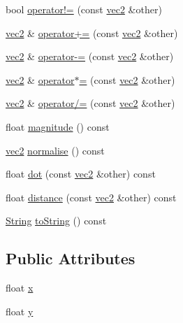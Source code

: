 \begin{DoxyCompactItemize}
\item 
bool \hyperlink{structspork_1_1maths_1_1vec2_aeb16440e205e6a8012bc92d48b904600}{operator!=} (const \hyperlink{structspork_1_1maths_1_1vec2}{vec2} \&other)
\item 
\hyperlink{structspork_1_1maths_1_1vec2}{vec2} \& \hyperlink{structspork_1_1maths_1_1vec2_a5a4c857c0a9d6ae8566b3b923f588800}{operator+=} (const \hyperlink{structspork_1_1maths_1_1vec2}{vec2} \&other)
\item 
\hyperlink{structspork_1_1maths_1_1vec2}{vec2} \& \hyperlink{structspork_1_1maths_1_1vec2_a717c7f2437ffa1142baaf2c1c4deae89}{operator-\/=} (const \hyperlink{structspork_1_1maths_1_1vec2}{vec2} \&other)
\item 
\hyperlink{structspork_1_1maths_1_1vec2}{vec2} \& \hyperlink{structspork_1_1maths_1_1vec2_af5a50810095db0445b4ad5fb9b06b90b}{operator$\ast$=} (const \hyperlink{structspork_1_1maths_1_1vec2}{vec2} \&other)
\item 
\hyperlink{structspork_1_1maths_1_1vec2}{vec2} \& \hyperlink{structspork_1_1maths_1_1vec2_a7094862096d511a61623003a63a94dfb}{operator/=} (const \hyperlink{structspork_1_1maths_1_1vec2}{vec2} \&other)
\item 
float \hyperlink{structspork_1_1maths_1_1vec2_a412737e35d7129a24ff0bde53f4c3976}{magnitude} () const
\item 
\hyperlink{structspork_1_1maths_1_1vec2}{vec2} \hyperlink{structspork_1_1maths_1_1vec2_a673f18bc75db7ac6b1612d4020cf087a}{normalise} () const
\item 
float \hyperlink{structspork_1_1maths_1_1vec2_a482cdb63a5860e0a29f039d91b24dc5a}{dot} (const \hyperlink{structspork_1_1maths_1_1vec2}{vec2} \&other) const
\item 
float \hyperlink{structspork_1_1maths_1_1vec2_ad58e41561822afb1864c07a3671e89cf}{distance} (const \hyperlink{structspork_1_1maths_1_1vec2}{vec2} \&other) const
\item 
\hyperlink{my_string_8h_afbeda3fd1bdc8c37d01bdf9f5c8274ff}{String} \hyperlink{structspork_1_1maths_1_1vec2_a182193d0199a8e80c91491841b403016}{to\+String} () const
\end{DoxyCompactItemize}
\subsection*{Public Attributes}
\begin{DoxyCompactItemize}
\item 
float \hyperlink{structspork_1_1maths_1_1vec2_a9101ec8c3e2125983dc92dfc33df946b}{x}
\item 
float \hyperlink{structspork_1_1maths_1_1vec2_a9fb4d0466eed13ffa264cdcb7239f10d}{y}
\end{DoxyCompactItemize}
